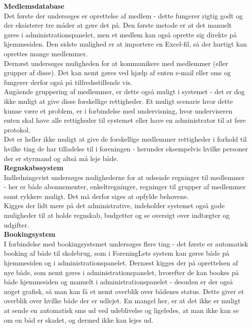{\bf Medlemsdatabase}\\
Det første der undersøges er oprettelse af medlem - dette fungerer rigtig godt og der eksisterer tre måder at gøre det på. Den første metode er at det manuelt gøres i administrationspanelet, men et medlem kan også oprette sig direkte på hjemmesiden. Den sidste mulighed er at importere en Excel-fil, så der hurtigt kan oprettes mange medlemmer.\\

Dernæst undersøges muligheden for at kommunikere med medlemmer (eller grupper af disse). Det kan nemt gøres ved hjælp af enten e-mail eller sms og fungerer derfor også på tilfredsstillende vis.\\

Angående gruppering af medlemmer, er dette også muligt i systemet - det er dog ikke muligt at give disse forskellige rettigheder. Et muligt scenarie hvor dette kunne være et problem, er i forbindelse med undervisning, hvor underviseren enten skal have alle rettigheder til systemet eller have en administrator til at føre protokol.\\

Det er heller ikke muligt at give de forskellige medlemmer rettigheder i forhold til hvilke ting de har tilladelse til i foreningen - herunder eksempelvis hvilke personer der er styrmand og altså må leje både.\\

{\bf Regnskabssystem}\\
Indledningsvist undersøges mulighederne for at udsende regninger til medlemmer - her er både abonnementer, enkeltregninger, regninger til grupper af medlemmer samt rykkere muligt. Det må derfor siges at opfylde behovene.\\

Kigges der lidt mere på det administrative, indeholder systemet også gode muligheder til at holde regnskab, budgetter og se oversigt over indtægter og udgifter. \\

{\bf Bookingsystem}\\
I forbindelse med bookingsystemet undersøges flere ting - det første er automatisk booking af både til skolebrug, som i ForeningLets system kan gøres både på hjemmesiden og i administrationspanelet. Dernæst kigges der på oprettelsen af nye både, som nemt gøres i administrationspanelet, hvorefter de kan bookes på både hjemmesiden og manuelt i administrationspanelet - desuden er der også noget grafisk, så man kan få et nemt overblik over bådenes status. Dette giver et overblik over hvilke både der er udlejet. En mangel her, er at det ikke er muligt at sende en automatisk sms ud ved udeblivelse og ligeledes, at man ikke kan se om en båd er skadet, og dermed ikke kan lejes ud.\\

